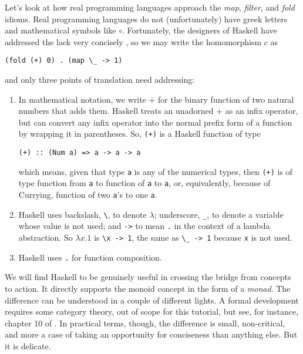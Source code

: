 Let's look at how real programming languages approach the \emph{map}, \emph{filter}, and \emph{fold} idioms. Real programming languages do not (unfortunately) have greek letters and mathematical symbols like $\circ$.
Fortunately, the designers of Haskell have addressed the lack very concisely \cite{haskellsite}, so we may write the homomorphism $c$ as
\begin{center}
  \verb"(fold (+) 0) . (map \_ -> 1)"
\end{center}
and only three points of translation need addressing:
\begin{enumerate}
	\item In mathematical notation, we write $+$ for the binary function of two natural numbers that adds them. Haskell treats an unadorned $+$ as an infix operator, but can convert any infix operator into the normal prefix form of a function by wrapping it in parentheses. So, \verb"(+)" is a Haskell function of type
\begin{center}
  \verb"(+) :: (Num a) => a -> a -> a"
\end{center}
which means, given that type \verb"a" is any of the numerical types, then \verb"(+)" is of type function from \verb"a" to function of \verb"a" to \verb"a", or, equivalently, because of Currying, function of two \verb"a"'s to one \verb"a".

  \item Haskell uses backslash, \verb"\", to denote $\lambda$; underscore, \verb"_", to denote a variable whose value is not used; and \verb"->" to mean \verb"." in the context of a lambda abstraction. So $\lambda x.1$ is \verb"\x -> 1", the same as \verb"\_ -> 1" because \verb"x" is not used.

  \item Haskell uses \verb"." for function composition.
\end{enumerate}


We will find Haskell to be genuinely useful in crossing the bridge from concepts to action. It directly supports the monoid concept in the form of a \emph{monad}. The difference can be understood in a couple of different lights. A formal development requires some category theory, out of scope for this tutorial, but see, for instance, chapter 10 of \cite{arrows}. In practical terms, though, the difference is small, non-critical, and more a case of taking an opportunity for conciseness than anything else. But it is delicate.


